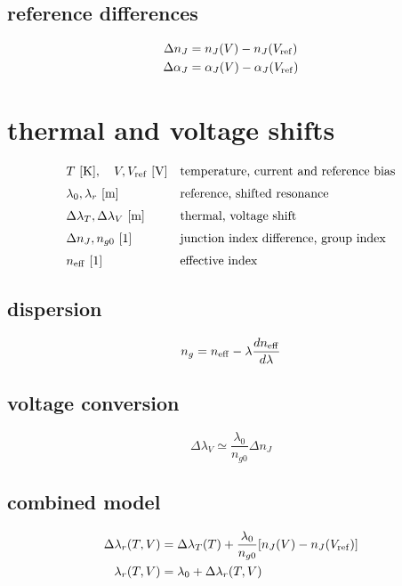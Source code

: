 \documentclass[11pt]{article}
\begin{document}
\subsection*{reference differences}
\[
\displaystyle \begin{aligned}\Delta n_J&=n_J(V)-n_J(V_{\rm ref})\\\Delta\alpha_J&=\alpha_J(V)-\alpha_J(V_{\rm ref})\end{aligned}
\]

\clearpage
\section*{thermal and voltage shifts}
\[
\begin{array}{ll}T\ [\mathrm K],\quad V,V_{\rm ref}\ [\mathrm V]&\text{temperature, current and reference bias}\\[0.6em]\lambda_0,\lambda_r\ [\mathrm m]&\text{reference, shifted resonance}\\[0.6em]\Delta\lambda_T,\Delta\lambda_V\ [\mathrm m]&\text{thermal, voltage shift}\\[0.6em]\Delta n_J,n_{g0}\ [1]&\text{junction index difference, group index}\\[0.6em]n_{\rm eff}\ [1]&\text{effective index}\end{array}
\]
\subsection*{dispersion}
\[
\displaystyle n_g=n_{\rm eff}-\lambda\frac{dn_{\rm eff}}{d\lambda}
\]
\subsection*{voltage conversion}
\[
\displaystyle \Delta\lambda_V\simeq\frac{\lambda_0}{n_{g0}}\Delta n_J
\]
\subsection*{combined model}
\[
\displaystyle \begin{aligned}\Delta\lambda_r(T,V)&=\Delta\lambda_T(T)+\frac{\lambda_0}{n_{g0}}[n_J(V)-n_J(V_{\rm ref})]\\\lambda_r(T,V)&=\lambda_0+\Delta\lambda_r(T,V)\end{aligned}
\]

\clearpage
\end{document}
